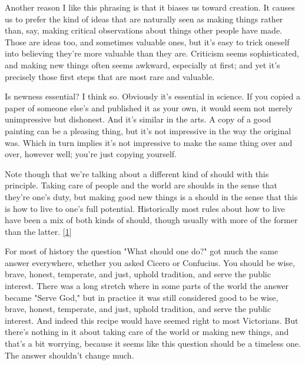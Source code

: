 Another
                  reason I like this phrasing is that it biases us toward
                  creation. It causes us to prefer the kind of ideas that are
                  naturally seen as making things rather than, say, making
                  critical observations about things other people have made.
                  Those are ideas too, and sometimes valuable ones, but it's
                  easy to trick oneself into believing they're more valuable
                  than they are. Criticism seems sophisticated, and making new
                  things often seems awkward, especially at first; and yet it's
                  precisely those first steps that are most rare and
                  valuable.

Is newness essential? I think so.
                  Obviously it's essential in science. If you copied a paper of
                  someone else's and published it as your own, it would seem not
                  merely unimpressive but dishonest. And it's similar in the
                  arts. A copy of a good painting can be a pleasing thing, but
                  it's not impressive in the way the original was. Which in turn
                  implies it's not impressive to make the same thing over and
                  over, however well; you're just copying yourself.

Note
                  though that we're talking about a different kind of should
                  with this principle. Taking care of people and the world are
                  shoulds in the sense that they're one's duty, but making good
                  new things is a should in the sense that this is how to live
                  to one's full potential. Historically most rules about how to
                  live have been a mix of both kinds of should, though usually
                  with more of the former than the latter.
                  [\href{\#f1n}{1}]

For most of history the question "What should one
                  do?" got much the same answer everywhere, whether you asked
                  Cicero or Confucius. You should be wise, brave, honest,
                  temperate, and just, uphold tradition, and serve the public
                  interest. There was a long stretch where in some parts of the
                  world the answer became "Serve God," but in practice it was
                  still considered good to be wise, brave, honest, temperate,
                  and just, uphold tradition, and serve the public interest. And
                  indeed this recipe would have seemed right to most Victorians.
                  But there's nothing in it about taking care of the world or
                  making new things, and that's a bit worrying, because it seems
                  like this question should be a timeless one. The answer
                  shouldn't change much.

